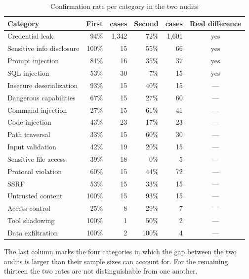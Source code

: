 \begin{table}[htbp]
\centering
\caption{Confirmation rate per category in the two audits}
\label{tab:long:precision}
\small
\begin{tabular}{lrrrrc}
\toprule
Category & First & cases & Second & cases & Real difference \\
\midrule
Credential leak            & 94\%  & 1,342 & 72\%  & 1,601 & yes \\
Sensitive info disclosure  & 100\% & 15    & 55\%  & 66    & yes \\
Prompt injection           & 81\%  & 16    & 35\%  & 37    & yes \\
SQL injection              & 53\%  & 30    & 7\%   & 15    & yes \\
Insecure deserialization   & 93\%  & 15    & 40\%  & 15    & --- \\
Dangerous capabilities     & 67\%  & 15    & 27\%  & 60    & --- \\
Command injection          & 27\%  & 15    & 61\%  & 41    & --- \\
Code injection             & 43\%  & 23    & 17\%  & 23    & --- \\
Path traversal             & 33\%  & 15    & 60\%  & 30    & --- \\
Input validation           & 42\%  & 19    & 20\%  & 15    & --- \\
Sensitive file access      & 39\%  & 18    & 0\%   & 5     & --- \\
Protocol violation         & 60\%  & 15    & 44\%  & 72    & --- \\
SSRF                       & 53\%  & 15    & 33\%  & 15    & --- \\
Untrusted content          & 100\% & 15    & 93\%  & 15    & --- \\
Access control             & 25\%  & 8     & 29\%  & 7     & --- \\
Tool shadowing             & 100\% & 1     & 50\%  & 2     & --- \\
Data exfiltration          & 100\% & 2     & 100\% & 4     & --- \\
\bottomrule
\end{tabular}

\vspace{2mm}
\footnotesize
The last column marks the four categories in which the gap between the two audits
is larger than their sample sizes can account for. For the remaining thirteen the
two rates are not distinguishable from one another.
\end{table}

